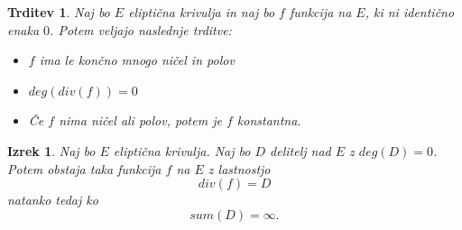 \documentclass[12pt,a4paper,twoside]{article}
\theoremstyle{definition} %
\theoremstyle{plain} %
\newtheorem{izrek}[definicija]{Izrek}
\newtheorem{trditev}[definicija]{Trditev}
\numberwithin{equation}{section}  %
\begin{document}
\begin{trditev}
\label{trditev 11.1}
Naj bo $E$ eliptična krivulja in naj bo $f$ funkcija na $E$, ki ni identično enaka $0$. Potem veljajo naslednje trditve:
\begin{itemize}

\item $f$ ima le končno mnogo ničel in polov
\item $deg(div(f))=0$
\item Če $f$ nima ničel ali polov, potem je $f$ konstantna.
\end{itemize}


\end{trditev}

\begin{izrek}
\label{izrek 11.2}
Naj bo $E$ eliptična krivulja. Naj bo $D$ delitelj nad $E$ z $deg(D) = 0$. Potem obstaja taka funkcija $f$ na $E$ z lastnostjo
$$div(f) = D$$
natanko tedaj ko
$$sum(D) = \infty.$$

\end{izrek}
\end{document}
